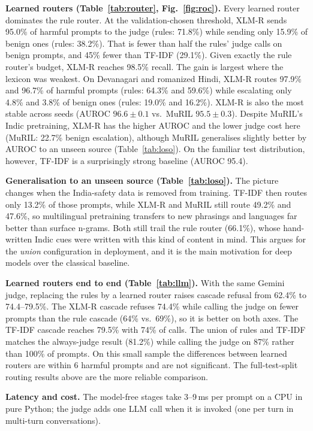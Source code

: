 \documentclass[conference]{IEEEtran}
\begin{document}
\textbf{Learned routers (Table~\ref{tab:router}, Fig.~\ref{fig:roc}).} Every learned router dominates the rule router. At the validation-chosen threshold, XLM-R sends 95.0\% of harmful prompts to the judge (rules: 71.8\%) while sending only 15.9\% of benign ones (rules: 38.2\%). That is fewer than half the rules' judge calls on benign prompts, and 45\% fewer than TF-IDF (29.1\%). Given exactly the rule router's budget, XLM-R reaches 98.5\% recall. The gain is largest where the lexicon was weakest. On Devanagari and romanized Hindi, XLM-R routes 97.9\% and 96.7\% of harmful prompts (rules: 64.3\% and 59.6\%) while escalating only 4.8\% and 3.8\% of benign ones (rules: 19.0\% and 16.2\%). XLM-R is also the most stable across seeds (AUROC $96.6\pm0.1$ vs.\ MuRIL $95.5\pm0.3$). Despite MuRIL's Indic pretraining, XLM-R has the higher AUROC and the lower judge cost here (MuRIL: 22.7\% benign escalation), although MuRIL generalises slightly better by AUROC to an unseen source (Table~\ref{tab:loso}). On the familiar test distribution, however, TF-IDF is a surprisingly strong baseline (AUROC 95.4).

\textbf{Generalisation to an unseen source (Table~\ref{tab:loso}).} The picture changes when the India-safety data is removed from training. TF-IDF then routes only 13.2\% of those prompts, while XLM-R and MuRIL still route 49.2\% and 47.6\%, so multilingual pretraining transfers to new phrasings and languages far better than surface n-grams. Both still trail the rule router (66.1\%), whose hand-written Indic cues were written with this kind of content in mind. This argues for the \emph{union} configuration in deployment, and it is the main motivation for deep models over the classical baseline.

\textbf{Learned routers end to end (Table~\ref{tab:llm}).} With the same Gemini judge, replacing the rules by a learned router raises cascade refusal from 62.4\% to 74.4--79.5\%. The XLM-R cascade refuses 74.4\% while calling the judge on fewer prompts than the rule cascade (64\% vs.\ 69\%), so it is better on both axes. The TF-IDF cascade reaches 79.5\% with 74\% of calls. The union of rules and TF-IDF matches the always-judge result (81.2\%) while calling the judge on 87\% rather than 100\% of prompts. On this small sample the differences between learned routers are within 6 harmful prompts and are not significant. The full-test-split routing results above are the more reliable comparison.

\textbf{Latency and cost.} The model-free stages take 3--9\,ms per prompt on a CPU in pure Python; the judge adds one LLM call when it is invoked (one per turn in multi-turn conversations).
\end{document}
